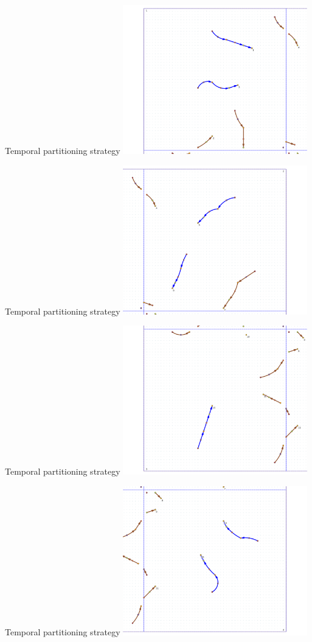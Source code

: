 \documentclass{beamer}
\begin{document}
\begin{frame}{Temporal partitioning strategy}
    \centering
    \includegraphics[width=0.6\textwidth]{figures/Q1}
\end{frame}
\begin{frame}{Temporal partitioning strategy}
    \centering
    \includegraphics[width=0.6\textwidth]{figures/Q2}
\end{frame}
\begin{frame}{Temporal partitioning strategy}
    \centering
    \includegraphics[width=0.6\textwidth]{figures/Q3}
\end{frame}
\begin{frame}{Temporal partitioning strategy}
    \centering
    \includegraphics[width=0.6\textwidth]{figures/Q4}
\end{frame}
\end{document}
